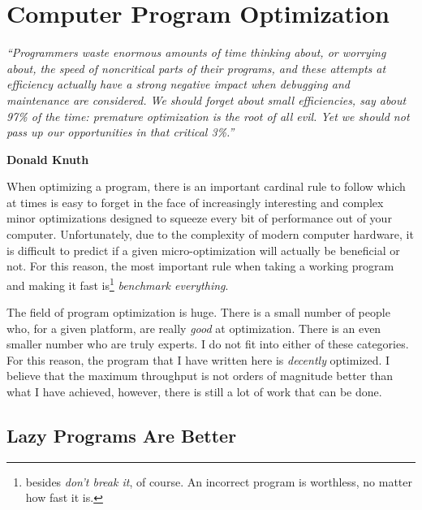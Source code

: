 \section{Computer Program Optimization} \label{app:opt}

\begin{addmargin}[16em]{0em}
	\begin{singlespace}
	{\footnotesize
	\textit{``Programmers waste enormous amounts of time thinking about, or worrying about, the speed of noncritical parts of their programs, and these attempts at efficiency actually have a strong negative impact when debugging and maintenance are considered. We should forget about small efficiencies, say about 97\% of the time: premature optimization is the root of all evil. Yet we should not pass up our opportunities in that critical 3\%.''}
		\begin{flushright}
		\textbf{Donald Knuth}
		\end{flushright}
	}
	\end{singlespace}
\end{addmargin}

When optimizing a program, there is an important cardinal rule to follow which at times
is easy to forget in the face of increasingly interesting and complex minor optimizations
designed to squeeze every bit of performance out of your computer. Unfortunately, due
to the complexity of modern computer hardware, it is
difficult to predict if a given micro-optimization will actually be beneficial or
not. For this reason, the most important rule when taking a working program and making it
fast is\footnote{besides \textit{don't break it}, of course. An incorrect program is worthless, no matter
how fast it is.} \textit{benchmark everything}.

The field of program optimization is huge. There is a small number of people who, for
a given platform, are really \textit{good} at optimization. There is an even smaller number
who are truly experts. I do not fit into either of these categories. For this reason, the program
that I have written here is \textit{decently} optimized. I believe that the maximum throughput
is not orders of magnitude better than what I have achieved, however, there is still a lot of work
that can be done.

\subsection{Lazy Programs Are Better}

